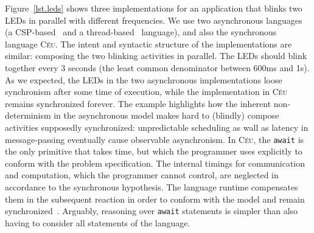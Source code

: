 \documentclass{acm_proc_article-sp}
\newcommand{\CEU}{\textsc{C\'{e}u}\xspace}
\newcommand{\code}[1] {{\small{\texttt{#1}}}}
\newcommand{\1}{\;}
\newcommand{\2}{\;\;}
\newcommand{\3}{\;\;\;}
\newcommand{\5}{\;\;\;\;\;}
\begin{document}

Figure~\ref{lst.leds} shows three implementations for an application that 
blinks two LEDs in parallel with different frequencies.
We use two asynchronous languages (a CSP-based~\cite{arduino.occam} and a 
thread-based~\cite{arduino.chibios} language), and also the synchronous 
language \CEU.
%
The intent and syntactic structure of the implementations are similar:
composing the two blinking activities in parallel.
%
The LEDs should blink together every 3 seconds (the least common denominator 
between 600ms and 1s).
%
As we expected, the LEDs in the two asynchronous implementations loose 
synchronism after some time of execution, while the implementation in \CEU 
remains synchronized forever.
%
The example highlights how the inherent non-determinism in the asynchronous 
model makes hard to (blindly) compose activities supposedly synchronized: 
unpredictable scheduling as wall as latency in message-passing eventually cause 
observable asynchronism.
%
In \CEU, the \code{await} is the only primitive that takes time, but which the 
programmer uses explicitly to conform with the problem specification.
The internal timings for communication and computation, which the programmer 
cannot control, are neglected in accordance to the synchronous hypothesis.
The language runtime compensates them in the subsequent reaction in order to 
conform with the model and remain synchronized~\cite{ceu.sensys13}.
%
Arguably, reasoning over \code{await} statements is simpler than also having to 
consider all statements of the language.
\end{document}
